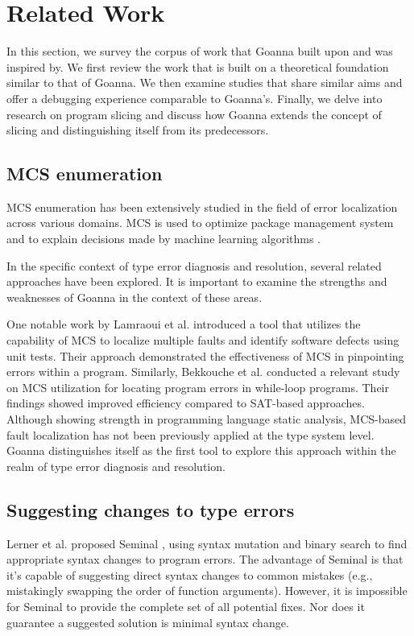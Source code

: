 \documentclass[pdflatex,sn-mathphys-num]{sn-jnl}%
\begin{document}
\section{Related Work} 
    \label{sec:related-work}
    In this section, we survey the corpus of work that Goanna built upon and was inspired by. We first review the work that is built on a theoretical foundation similar to that of Goanna. We then examine studies that share similar aims and offer a debugging experience comparable to Goanna's. Finally, we delve into research on program slicing and discuss how Goanna extends the concept of slicing and distinguishing itself from its predecessors.

    \subsection{MCS enumeration}
	
    MCS enumeration has been extensively studied in the field of error localization across various domains. MCS is used to optimize package management system \cite{Ignatiev2014-nr} and to explain decisions made by machine learning algorithms \cite{Marques-Silva2023-nk}.
    
    
    In the specific context of type error diagnosis and resolution, several related approaches have been explored. It is important to examine the strengths and weaknesses of Goanna in the context of these areas.

    One notable work by Lamraoui et al. introduced a tool \cite{Lamraoui2016-wr} that utilizes the capability of MCS to localize multiple faults and identify software defects using unit tests. Their approach demonstrated the effectiveness of MCS in pinpointing errors within a program. Similarly, Bekkouche et al. conducted a relevant study  \cite{Bekkouche2015-is}  on MCS utilization for locating program errors in while-loop programs. Their findings showed improved efficiency compared to SAT-based approaches. Although showing strength in programming language static analysis, MCS-based fault localization has not been previously applied at the type system level. Goanna distinguishes itself as the first tool to explore this approach within the realm of type error diagnosis and resolution.

    \subsection{Suggesting changes to type errors}
   Lerner et al. proposed Seminal \cite{Lerner2007-mu}, using syntax mutation and binary search to find appropriate syntax changes to program errors. The advantage of Seminal is that it's capable of suggesting direct syntax changes to common mistakes (e.g., mistakingly swapping the order of function arguments). However, it is impossible for Seminal to provide the complete set of all potential fixes. Nor does it guarantee a suggested solution is minimal syntax change.
   
\end{document}
